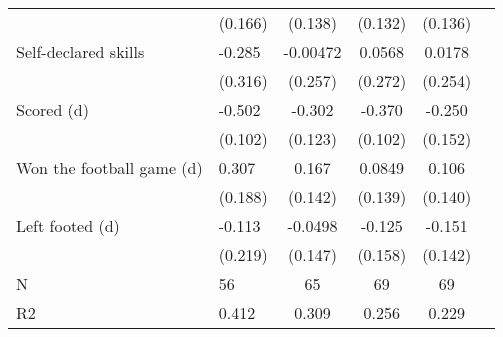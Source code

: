 {\begin{tabularx}{\textwidth}{Xl*{4}{c}}
                    &     (0.166)         &     (0.138)         &     (0.132)         &     (0.136)         \\
[0.5em]
Self-declared skills&      -0.285         &    -0.00472         &      0.0568         &      0.0178         \\
                    &     (0.316)         &     (0.257)         &     (0.272)         &     (0.254)         \\
[0.5em]
Scored (d)          &      -0.502\sym{***}&      -0.302\sym{**} &      -0.370\sym{***}&      -0.250         \\
                    &     (0.102)         &     (0.123)         &     (0.102)         &     (0.152)         \\
[0.5em]
Won the football game (d)&       0.307         &       0.167         &      0.0849         &       0.106         \\
                    &     (0.188)         &     (0.142)         &     (0.139)         &     (0.140)         \\
[0.5em]
Left footed (d)     &      -0.113         &     -0.0498         &      -0.125         &      -0.151         \\
                    &     (0.219)         &     (0.147)         &     (0.158)         &     (0.142)         \\
\hline
N                   &          56         &          65         &          69         &          69         \\
R2                  &       0.412         &       0.309         &       0.256         &       0.229         \\
\hline\hline
\end{tabularx}
}
